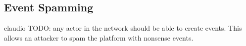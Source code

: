 \subsection{Event Spamming}\label{subsection:event-spamming}
claudio
TODO: any actor in the network should be able to create events. This allows an attacker to spam the platform with nonsense events. 